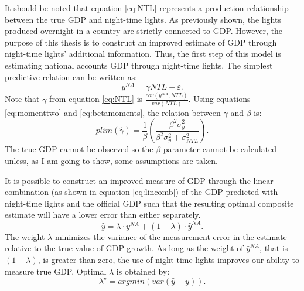 It should be noted that equation \ref{eq:NTL} represents a production relationship between the true GDP and night-time lights. As previously shown, the lights produced overnight in a country are strictly connected to GDP. However, the purpose of this thesis is to construct an improved estimate of GDP through night-time lights' additional information. Thus, the first step of this model is estimating national accounts GDP through night-time lights.
The simplest predictive relation can be written as:
\begin{equation}
    \label{eq:proxy}
    y^{NA}=\gamma NTL+\varepsilon.
\end{equation}
Note that $\gamma$ from equation \ref{eq:NTL} is $\frac{cov(y^{NA}, NTL)}{var(NTL)}$.
Using equations \ref{eq:momenttwo} and \ref{eq:betamoments}, the relation between $\gamma$ and $\beta$ is:
\begin{equation}
\label{eq:plim}
    plim\left(\hat{\gamma}\right)=\frac{1}{\beta}\left(\frac{\beta^2\sigma_y^2}{\beta^2\sigma^2_y+\sigma_{NTL}^2}\right).
\end{equation}
The true GDP cannot be observed so the $\beta$ parameter cannot be calculated unless, as I am going to show, some assumptions are taken.

It is possible to construct an improved measure of GDP through the linear combination (as shown in equation \ref{eq:lincomb}) of the GDP predicted with night-time lights and the official GDP such that the resulting optimal composite estimate will have a lower error than either separately.
\begin{equation}
\hat{y}=\lambda\cdot y^{NA}+(1-\lambda)\cdot \hat{y}^{NA}.
\label{eq:lincomb}
\end{equation}
The weight $\lambda$ minimizes the variance of the measurement error in the estimate relative to the true value of GDP growth. As long as the weight of $\hat{y}^{NA}$, that is $(1-\lambda)$, is greater than zero, the use of night-time lights improves our ability to measure true GDP. Optimal $\lambda$ is obtained by:
\begin{equation}
    \lambda^\star=argmin\left(var(\hat{y}-y)\right).
\end{equation}

